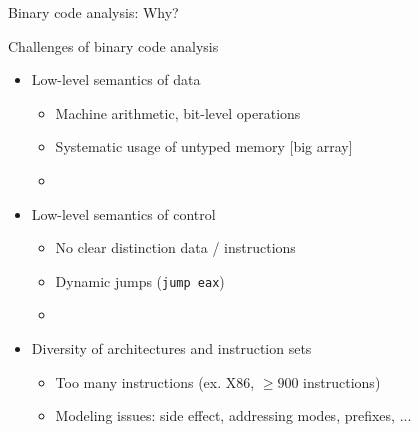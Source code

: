 \begin{frame}{Binary code analysis: Why?}

\end{frame}



\begin{frame}{Challenges of binary code analysis}
  \begin{itemize}
  \item Low-level semantics of data
   \begin{itemize}
   \item Machine arithmetic, bit-level operations
   \item Systematic usage of untyped memory [big array]
   \item[] {\color{red}{Difficult for current formal techniques}}
   \end{itemize}
   \bigskip
   \item Low-level semantics of control
   \begin{itemize}
   \item No clear distinction data / instructions
   \item Dynamic jumps ({\tt jump eax})
   \item[] {\color{red}{No easy syntactic recovery of CFG}}
   \end{itemize}
   \bigskip
   \item Diversity of architectures and instruction sets 
   \begin{itemize}
   \item Too many instructions (ex. X86, $\geq900$ instructions)
   \item Modeling issues: side effect, addressing modes, prefixes, ...
   \end{itemize}
   \end{itemize}
\end{frame}



